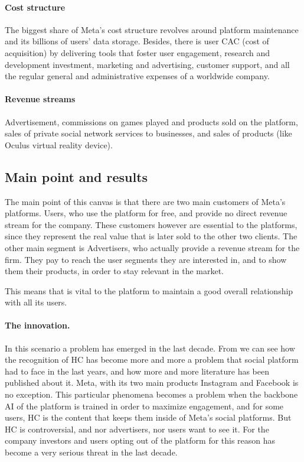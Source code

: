 \paragraph{Cost structure}
The biggest share of Meta's cost structure revolves around platform
maintenance and its billions of users' data storage. Besides, there is
user CAC (cost of acquisition) by delivering tools that foster user
engagement, research and development investment, marketing and
advertising, customer support, and all the regular general and
administrative expenses of a worldwide company.

\paragraph{Revenue streams}
Advertisement, commissions on games played and products sold on the
platform, sales of private social network services to businesses, and
sales of products (like Oculus virtual reality device).

\subsection{Main point and results}
The main point of this canvas is that there are two main customers of
Meta's platforms. Users, who use the platform for free, and provide no
direct revenue stream for the company. These customers however are
essential to the platforms, since they represent the real value that
is later sold to the other two clients. The other main segment is
Advertisers, who actually provide a revenue stream for the firm. They
pay to reach the user segments they are interested in, and to show
them their products, in order to stay relevant in the market.

This means that is vital to the platform to maintain a good overall
relationship with all its users.

\paragraph{The innovation.}
In this scenario a problem has emerged in the last decade. From
\cite{art:fortuna2018survey} we can see how the recognition of HC has
become more and more a problem that social platform had to face in the
last years, and how more and more literature has been published about
it. Meta, with its two main products Instagram and Facebook is no
exception. This particular phenomena becomes a problem when the
backbone AI of the platform is trained in order to maximize
engagement, and for some users, HC is the content that keeps them
inside of Meta's social platforms. But HC is controversial, and nor
advertisers, nor users want to see it. For the company investors and
users opting out of the platform for this reason has become a very
serious threat in the last decade.

